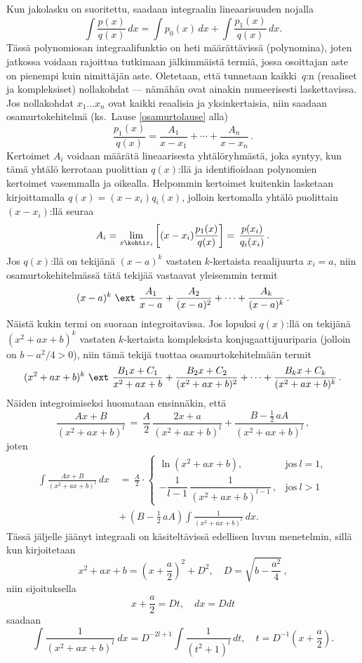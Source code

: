 Kun jakolasku on suoritettu, saadaan integraalin lineaarisuuden nojalla
\[
\int\frac{p(x)}{q(x)}\, dx=\int p_0(x)\, dx+\int\frac{p_1(x)}{q(x)}\, dx.
\]
Tässä polynomiosan integraalifunktio on heti määrättävissä (polynomina), joten jatkossa
voidaan rajoittua tutkimaan jälkimmäistä termiä, jossa osoittajan aste on pienempi kuin
nimittäjän aste. Oletetaan, että tunnetaan kaikki $q$:n (reaaliset ja kompleksiset)
nollakohdat --- nämähän ovat ainakin numeerisesti laskettavissa. Jos nollakohdat
$x_1\ldots x_n$ ovat kaikki reaalisia ja yksinkertaisia, niin saadaan osamurtokehitelmä
(ks.\ Lause \ref{osamurtolause} alla)
\[
\frac{p_1(x)}{q(x)}=\frac{A_1}{x-x_1}+\cdots +\frac{A_n}{x-x_n}\,.
\]
Kertoimet $A_i$ voidaan määrätä lineaarisesta yhtälöryhmästä, joka syntyy, kun tämä yhtälö
kerrotaan puolittian $q(x)$:llä ja identifioidaan polynomien kertoimet vasemmalla ja oikealla.
Helpommin kertoimet kuitenkin lasketaan kirjoittamalla $q(x)=(x-x_i)q_i(x)$, jolloin
kertomalla yhtälö puolittain $(x-x_i)$:llä seuraa
\[
A_i=\lim_{x\kohti x_i} \left[(x-x_i)\frac{p_1(x)}{q(x)}\right] =\, \frac{p(x_i)}{q_i(x_i)}\,.
\]
Jos $q(x)$:llä on tekijänä $(x-a)^k$ vastaten $k$-kertaista reaalijuurta $x_i=a$, niin
osamurtokehitelmässä tätä tekijää vastaavat yleisemmin termit
\[
(x-a)^k\ \ext\ \frac{A_1}{x-a}+\frac{A_2}{(x-a)^2}+\cdots +\frac{A_k}{(x-a)^k}\,.
\]
Näistä kukin termi on suoraan integroitavissa. Jos lopuksi $q(x)$:llä on tekijänä
$(x^2+ax+b)^k$ vastaten $k$-kertaista kompleksista konjugaattijuuriparia 
(jolloin on $b-a^2/4>0$), niin tämä tekijä tuottaa osamurtokehitelmään termit
\[
(x^2+ax+b)^k\ \ext\ \frac{B_1 x+C_1}{x^2+ax+b}
             +\frac{B_2 x+C_2}{(x^2+ax+b)^2}+\cdots + \frac{B_k x+C_k}{(x^2+ax+b)^k}\,.
\]
Näiden integroimiseksi huomataan ensinnäkin, että
\[
\frac{Ax+B}{(x^2+ax+b)^l}\,
          =\,\frac{A}{2}\,\frac{2x+a}{(x^2+ax+b)^l}+\frac{B-\frac{1}{2}\,aA}{(x^2+ax+b)^l}\,,
\]
joten
\begin{align*}
\int\frac{Ax+B}{(x^2+ax+b)^l}\,dx\, 
        &=\,\frac{A}{2}\cdot\begin{cases}
                            \ln (x^2+ax+b),                                &\text{jos}\ l=1, \\
                            -\dfrac{1}{l-1}\,\dfrac{1}{(x^2+ax+b)^{l-1}}\,, &\text{jos}\ l>1
                            \end{cases} \\
        &+\,(B-\frac{1}{2}\,aA)\int\frac{1}{(x^2+ax+b)^l}\ dx.
\end{align*}
Tässä jäljelle jäänyt integraali on käsiteltävissä edellisen luvun menetelmin, sillä kun
kirjoitetaan
\[
x^2+ax+b = \left(x+\frac{a}{2}\right)^2 + D^2, \quad D=\sqrt{b-\frac{a^2}{4}}\,,
\]
niin sijoituksella 
\[
x+\frac{a}{2} = Dt, \quad dx = D dt
\]
saadaan
\[
\int\frac{1}{(x^2+ax+b)^l}\ dx 
        = D^{-2l+1}\int \frac{1}{(t^2+1)^l}\,dt, \quad t=D^{-1}\left(x+\frac{a}{2}\right).
\]

